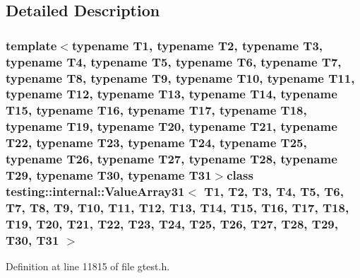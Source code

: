\subsection{\-Detailed \-Description}
\subsubsection*{template$<$typename T1, typename T2, typename T3, typename T4, typename T5, typename T6, typename T7, typename T8, typename T9, typename T10, typename T11, typename T12, typename T13, typename T14, typename T15, typename T16, typename T17, typename T18, typename T19, typename T20, typename T21, typename T22, typename T23, typename T24, typename T25, typename T26, typename T27, typename T28, typename T29, typename T30, typename T31$>$class testing\-::internal\-::\-Value\-Array31$<$ T1, T2, T3, T4, T5, T6, T7, T8, T9, T10, T11, T12, T13, T14, T15, T16, T17, T18, T19, T20, T21, T22, T23, T24, T25, T26, T27, T28, T29, T30, T31 $>$}



\-Definition at line 11815 of file gtest.\-h.



